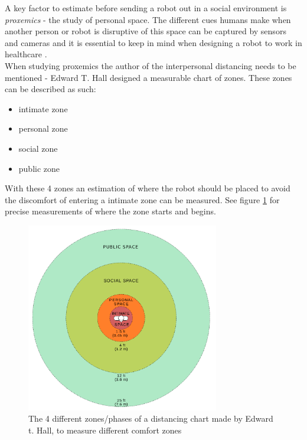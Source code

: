 A key factor to estimate before sending a robot out in a social environment is \textit{proxemics} - the study of personal space. The different cues humans make when another person or robot is disruptive of this space can be captured by sensors and cameras and it is essential to keep in mind when designing a robot to work in healthcare \cite{mumm2011human}.\\
When studying proxemics the author of the interpersonal distancing needs to be mentioned - Edward T. Hall designed a measurable chart of zones. These zones can be described as such:\\
\begin{itemize}
    \item intimate zone
    \item personal zone
    \item social zone
    \item public zone
\end{itemize}
With these 4 zones an estimation of where the robot should be placed to avoid the discomfort of entering a intimate zone can be measured. See figure \ref{fig:hall} for precise measurements of where the zone starts and begins.

\begin{figure}[H]
    \centering
    \includegraphics[width=0.75\textwidth]{figures/hall.png}
   \caption{The 4 different zones/phases of a distancing chart made by Edward t. Hall, to measure different comfort zones \cite{Hall}}
    \label{fig:hall}
\end{figure}

